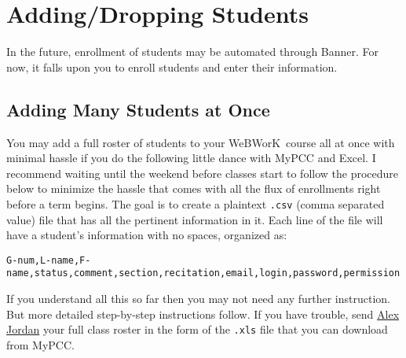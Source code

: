 \documentclass[12pt]{article}
\newcommand{\WW}{WeBWorK}
\begin{document}
\section{Adding/Dropping Students}
In the future, enrollment of students may be automated through Banner. For now, it falls upon you to enroll students and enter their information. 

\subsection{Adding Many Students at Once}
You may add a full roster of students to your \WW\ course all at once with minimal hassle if you do the following little dance with MyPCC and Excel.  I recommend waiting until the weekend before classes start to follow the procedure below to minimize the hassle that comes with all the flux of enrollments right before a term begins. The goal is to create a plaintext \texttt{.csv} (comma separated value) file that has all the pertinent information in it.  Each line of the file will have a student's information with no spaces, organized as:\\

\small
\centerline{\texttt{G-num,L-name,F-name,status,comment,section,recitation,email,login,password,permission}}
\normalsize
\vspace{1pc}

If you understand all this so far then you may not need any further instruction. But more detailed step-by-step instructions follow. If you have trouble, send \href{mailto:alex.jordan@pcc.edu}{Alex Jordan} your full class roster in the form of the \texttt{.xls} file that you can download from MyPCC.
\end{document}

